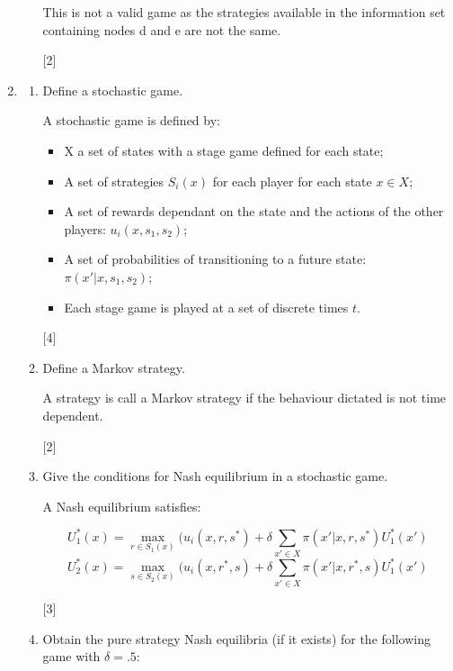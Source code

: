 \documentclass[12pt,a4paper]{article}
\begin{document}
\begin{enumerate}
\begin{enumerate}
                This is not a valid game as the strategies available in the information set containing nodes d and e are not the same.

                \hfill[2]

    \end{enumerate}

\newpage
\item


    \begin{enumerate}

        \item Define a stochastic game.

            A stochastic game is defined by:

            \begin{itemize}
            \item X a set of states with a stage game defined for each state;
            \item A set of strategies $S_i(x)$ for each player for each state $x\in X$;
            \item A set of rewards dependant on the state and the actions of the other players: $u_i(x,s_1,s_2)$;
            \item A set of probabilities of transitioning to a future state: $\pi(x'|x,s_1,s_2)$;
            \item Each stage game is played at a set of discrete times $t$.
            \end{itemize}

        \hfill[4]

        \item Define a Markov strategy.

            A strategy is call a Markov strategy if the behaviour dictated is not time dependent.

        \hfill[2]

        \item Give the conditions for Nash equilibrium in a stochastic game.

            A Nash equilibrium satisfies:

            $$U_1^*(x)=\max_{r\in S_1(x)}(u_i(x,r,s^*)+\delta\sum_{x'\in X}\pi(x'|x,r,s^*)U_1^*(x')$$
            $$U_2^*(x)=\max_{s\in S_2(x)}(u_i(x,r^*,s)+\delta\sum_{x'\in X}\pi(x'|x,r^*,s)U_1^*(x')$$

        \hfill[3]

        \item Obtain the pure strategy Nash equilibria (if it exists) for the following game with \(\delta=.5\):


\end{enumerate}
\end{enumerate}
\end{document}
